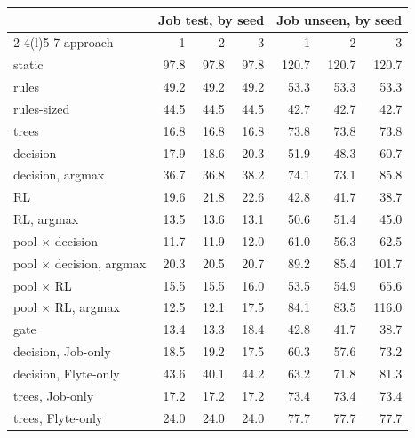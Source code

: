 \begin{tabular}{@{}lrrrrrr@{}}
\toprule
& \multicolumn{3}{c}{Job test, by seed} & \multicolumn{3}{c}{Job unseen, by seed} \\
\cmidrule(lr){2-4}\cmidrule(l){5-7}
approach & 1 & 2 & 3 & 1 & 2 & 3 \\
\midrule
static & 97.8 & 97.8 & 97.8 & 120.7 & 120.7 & 120.7 \\
rules & 49.2 & 49.2 & 49.2 & 53.3 & 53.3 & 53.3 \\
rules-sized & 44.5 & 44.5 & 44.5 & 42.7 & 42.7 & 42.7 \\
trees & 16.8 & 16.8 & 16.8 & 73.8 & 73.8 & 73.8 \\
decision & 17.9 & 18.6 & 20.3 & 51.9 & 48.3 & 60.7 \\
decision, argmax & 36.7 & 36.8 & 38.2 & 74.1 & 73.1 & 85.8 \\
RL & 19.6 & 21.8 & 22.6 & 42.8 & 41.7 & 38.7 \\
RL, argmax & 13.5 & 13.6 & 13.1 & 50.6 & 51.4 & 45.0 \\
pool $\times$ decision & 11.7 & 11.9 & 12.0 & 61.0 & 56.3 & 62.5 \\
pool $\times$ decision, argmax & 20.3 & 20.5 & 20.7 & 89.2 & 85.4 & 101.7 \\
pool $\times$ RL & 15.5 & 15.5 & 16.0 & 53.5 & 54.9 & 65.6 \\
pool $\times$ RL, argmax & 12.5 & 12.1 & 17.5 & 84.1 & 83.5 & 116.0 \\
gate & 13.4 & 13.3 & 18.4 & 42.8 & 41.7 & 38.7 \\
decision, Job-only & 18.5 & 19.2 & 17.5 & 60.3 & 57.6 & 73.2 \\
decision, Flyte-only & 43.6 & 40.1 & 44.2 & 63.2 & 71.8 & 81.3 \\
trees, Job-only & 17.2 & 17.2 & 17.2 & 73.4 & 73.4 & 73.4 \\
trees, Flyte-only & 24.0 & 24.0 & 24.0 & 77.7 & 77.7 & 77.7 \\
\bottomrule
\end{tabular}
